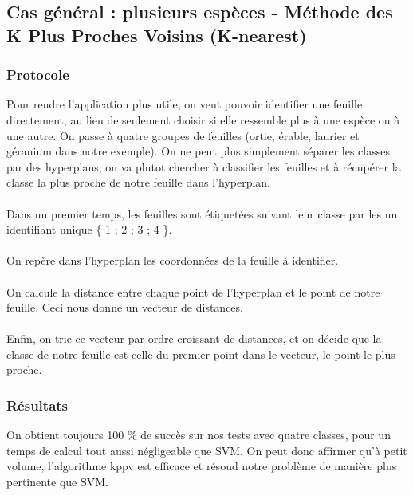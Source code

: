 \subsection{Cas général : plusieurs espèces - Méthode des K Plus Proches Voisins (K-nearest)}
\subsubsection{Protocole}
Pour rendre l'application plus utile, on veut pouvoir identifier une feuille directement, au lieu de seulement choisir si elle ressemble plus à une espèce ou à une autre.
On passe à quatre groupes de feuilles (ortie, érable, laurier et géranium dans notre exemple). On ne peut plus simplement séparer les classes par des hyperplans; on va plutot chercher à classifier les feuilles et à récupérer la classe la plus proche de notre feuille dans l'hyperplan.


\paragraph{}
Dans un premier temps, les feuilles sont étiquetées suivant leur classe par les un identifiant unique \{ 1 ; 2 ; 3 ; 4 \}. 
\paragraph{}
On repère dans l'hyperplan les coordonnées de la feuille à identifier.
\paragraph{}
On calcule la distance entre chaque point de l'hyperplan et le point de notre feuille. Ceci nous donne un vecteur de distances.
\paragraph{}
Enfin, on trie ce vecteur par ordre croissant de distances, et on décide que la classe de notre feuille est celle du premier point dans le vecteur, le point le plus proche.


\subsubsection{Résultats}
On obtient toujours 100 \% de succès sur nos tests avec quatre classes, pour un temps de calcul tout aussi négligeable que SVM. On peut donc affirmer qu'à petit volume, l'algorithme kppv est efficace et résoud notre problème de manière plus pertinente que SVM.